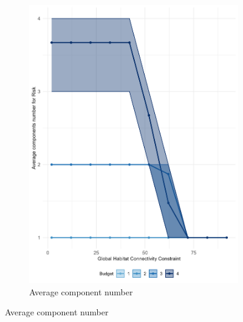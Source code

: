 \begin{figure}[h]
\begin{subfigure}[b]{.48\textwidth}
        \includegraphics[height = .4\textheight]{figures/wildland/average_components_number.jpg}
        \caption{Average component number}
        \label{fig:component_number}
    \end{subfigure}
    
    \vspace{1em} %


\end{figure}
